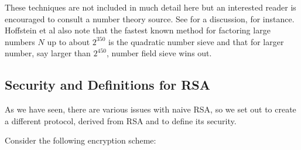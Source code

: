 These techniques are not included in much detail here but an interested reader is encouraged to consult a number theory source. See \cite{hoffstein2008introduction} for a discussion, for instance. Hoffstein et al also note that 
the fastest known method for factoring large numbers $N$ up to about $2^{350}$ is the quadratic number sieve and that for larger number, say larger than $2^{450}$, number field sieve wins out.






\subsection{Security and Definitions for RSA}
As we have seen, there are various issues with naive RSA, so we set out to create a different protocol, derived from RSA and to define its security.

Consider the following encryption scheme:

